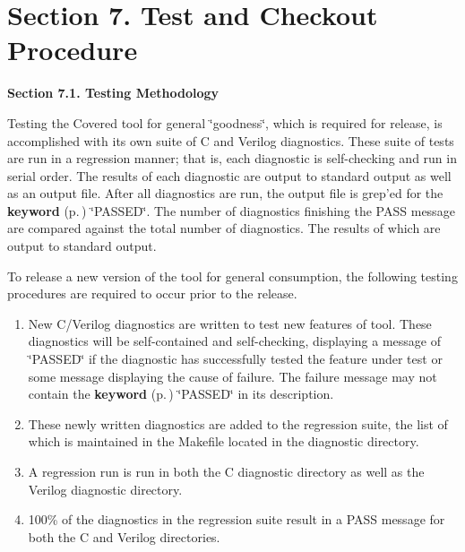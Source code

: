 \section{Section 7.  Test and Checkout Procedure}\label{page_testing}
 \begin{Desc}
\item[{\bf Section 7.1.  Testing Methodology}]\par
 Testing the Covered tool for general \char`\"{}goodness\char`\"{}, which is required for release, is  accomplished with its own suite of C and Verilog diagnostics. These suite of tests are run  in a regression manner; that is, each diagnostic is self-checking and run in serial order.  The results of each diagnostic are output to standard output as well as an output file. After all diagnostics are run, the output file is grep'ed for the {\bf keyword} {\rm (p.\,\pageref{structkeyword})} \char`\"{}PASSED\char`\"{}. The number of diagnostics finishing the PASS message are compared against the total number of diagnostics. The results of which are output to standard output.

 To release a new version of the tool for general consumption, the following testing procedures are required to occur prior to the release.\begin{enumerate}
\item 
New C/Verilog diagnostics are written to test new features of tool. These diagnostics will be self-contained and self-checking, displaying a message of \char`\"{}PASSED\char`\"{} if the diagnostic has successfully tested the feature under test or some message displaying the cause of failure. The failure message may not contain the {\bf keyword} {\rm (p.\,\pageref{structkeyword})} \char`\"{}PASSED\char`\"{} in its description.\item 
These newly written diagnostics are added to the regression suite, the list of which is maintained in the Makefile located in the diagnostic directory.\item 
A regression run is run in both the C diagnostic directory as well as the Verilog diagnostic directory.\item 
100\% of the diagnostics in the regression suite result in a PASS message for both the C and Verilog directories.\end{enumerate}
\end{Desc}


